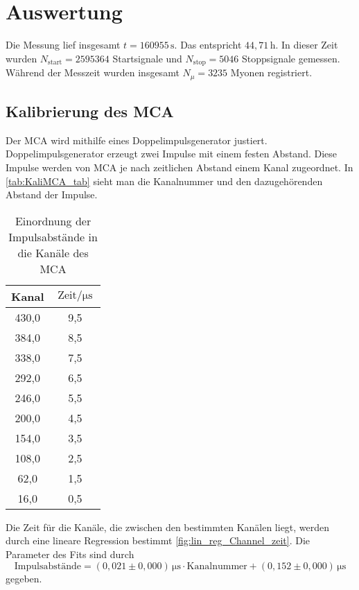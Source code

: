 \section{Auswertung}
\label{sec:auswertung}


Die Messung lief insgesamt $t = 160955 \, \unit{\second}$. Das entspricht $44,71 \, \unit{\hour}$. In dieser Zeit wurden $N_\text{start} = 2595364$ Startsignale und $N_\text{stop} = 5046$ Stoppsignale gemessen.
Während der Messzeit wurden insgesamt $N_{\mu} = 3235 $ Myonen registriert.

\subsection{Kalibrierung des MCA}
\label{sec:KaliMCA}

Der MCA wird mithilfe eines Doppelimpulsgenerator justiert. Doppelimpulsgenerator erzeugt zwei Impulse mit einem festen Abstand.
Diese Impulse werden von MCA je nach zeitlichen Abstand einem Kanal zugeordnet. In \autoref{tab:KaliMCA_tab} sieht man die Kanalnummer und den dazugehörenden Abstand der Impulse.

\begin{table}
    \centering
    \caption{Einordnung der Impulsabstände in die Kanäle des MCA}
    \label{tab:KaliMCA_tab}
    \begin{tabular}{c c}
    \toprule
     Kanal &  $\text{Zeit} \mathbin{/} \unit{\micro\second}$ \\
    \midrule
     430,0 &                             9,5 \\
     384,0 &                             8,5 \\
     338,0 &                             7,5 \\
     292,0 &                             6,5 \\
     246,0 &                             5,5 \\
     200,0 &                             4,5 \\
     154,0 &                             3,5 \\
     108,0 &                             2,5 \\
      62,0 &                             1,5 \\
      16,0 &                             0,5 \\
    \bottomrule
    \end{tabular}
    \end{table}

Die Zeit für die Kanäle, die zwischen den bestimmten Kanälen liegt, werden durch eine lineare Regression bestimmt \autoref{fig:lin_reg_Channel_zeit}.
Die Parameter des Fits sind durch 
\begin{equation*}
    \text{Impulsabstände} = \left(0,021 \pm 0,000 \right) \,\unit{\micro\second} \cdot  \text{Kanalnummer} + \left(0,152 \pm 0,000 \right) \,\unit{\micro\second}
    \label{eq:Kanal_Zeit_Rechnung}
\end{equation*}
gegeben.

